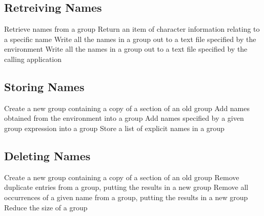 \subsection{Retreiving Names}

            {Retrieve names from a group}
            {Return an item of character information relating to a specific name}
            {Write all the names in a group out to a text file specified by the
environment}
            {Write all the names in a group out to a text file specified by the
calling application}


\subsection{Storing Names}

            {Create a new group containing a copy of a section of an old group}
            {Add names obtained from the environment into a group}
            {Add names specified by a given group expression into a group}
            {Store a list of explicit names in a group}



\subsection{Deleting Names}

            {Create a new group containing a copy of a section of an old group}
            {Remove duplicate entries from a group, putting the results in a new
group}
            {Remove all occurrences of a given name from a group, putting the results in a new group}
            {Reduce the size of a group}


